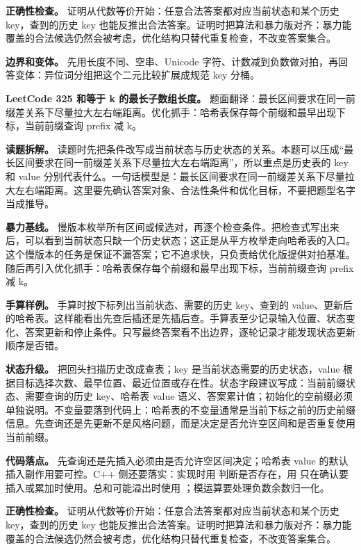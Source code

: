 \textbf{正确性检查。} 证明从代数等价开始：任意合法答案都对应当前状态和某个历史 key，查到的历史 key 也能反推出合法答案。证明时把算法和暴力版对齐：暴力能覆盖的合法候选仍然会被考虑，优化结构只替代重复检查，不改变答案集合。

\textbf{边界和变体。} 先用长度不同、空串、Unicode 字符、计数减到负数做对拍，再回答变体：异位词分组把这个二元比较扩展成规范 key 分桶。

\noindent\textbf{LeetCode 325 和等于 k 的最长子数组长度。} 题面翻译：最长区间要求在同一前缀差关系下尽量拉大左右端距离。优化抓手：哈希表保存每个前缀和最早出现下标，当前前缀查询 prefix 减 k。

\textbf{读题拆解。} 读题时先把条件改写成当前状态与历史状态的关系。本题可以压成“最长区间要求在同一前缀差关系下尽量拉大左右端距离”，所以重点是历史表的 key 和 value 分别代表什么。一句话模型是：最长区间要求在同一前缀差关系下尽量拉大左右端距离。这里要先确认答案对象、合法性条件和优化目标，不要把题型名字当成推导。

\textbf{暴力基线。} 慢版本枚举所有区间或候选对，再逐个检查条件。把检查式写出来后，可以看到当前状态只缺一个历史状态；这正是从平方枚举走向哈希表的入口。这个慢版本的任务是保证不漏答案；它不追求快，只负责给优化版提供对拍基准。随后再引入优化抓手：哈希表保存每个前缀和最早出现下标，当前前缀查询 prefix 减 k。

\textbf{手算样例。} 手算时按下标列出当前状态、需要的历史 key、查到的 value、更新后的哈希表。这样能看出先查后插还是先插后查。手算表至少记录输入位置、状态变化、答案更新和停止条件。只写最终答案看不出边界，逐轮记录才能发现状态更新顺序是否错。

\textbf{状态升级。} 把回头扫描历史改成查表；key 是当前状态需要的历史状态，value 根据目标选择次数、最早位置、最近位置或存在性。状态字段建议写成：当前前缀状态、需要查询的历史 key、哈希表 value 语义、答案累计值；初始化的空前缀必须单独说明。不变量要落到代码上：哈希表的不变量通常是当前下标之前的历史前缀信息。先查询还是先更新不是风格问题，而是决定是否允许空区间和是否重复使用当前前缀。

\textbf{代码落点。} 先查询还是先插入必须由是否允许空区间决定；哈希表 value 的默认插入副作用要可控。C++ 侧还要落实：实现时用  判断是否存在，用  只在确认要插入或累加时使用。总和可能溢出时使用 ；模运算要处理负数余数归一化。

\textbf{正确性检查。} 证明从代数等价开始：任意合法答案都对应当前状态和某个历史 key，查到的历史 key 也能反推出合法答案。证明时把算法和暴力版对齐：暴力能覆盖的合法候选仍然会被考虑，优化结构只替代重复检查，不改变答案集合。

